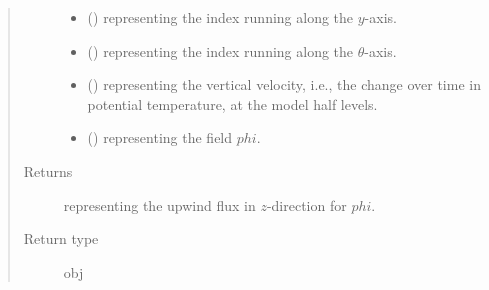 \documentclass[letterpaper,10pt,english]{sphinxmanual}
\begin{document}
\begin{fulllineitems}
\begin{fulllineitems}
\begin{quote}
\begin{description}
\begin{itemize}
\item {} 
 () \textendash{}  representing the index running along the \(y\)-axis.

\item {} 
 () \textendash{}  representing the index running along the \(\theta\)-axis.

\item {} 
 () \textendash{}  representing the vertical velocity, i.e., the change over time in
potential temperature, at the model half levels.

\item {} 
 () \textendash{}  representing the field \(phi\).

\end{itemize}

\item[{Returns}] \leavevmode
{} representing the upwind flux in \(z\)-direction for \(phi\).

\item[{Return type}] \leavevmode
obj

\end{description}\end{quote}

\end{fulllineitems}


\end{fulllineitems}

\end{document}
